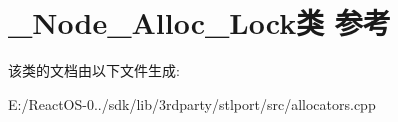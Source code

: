 \hypertarget{class___node___alloc___lock}{}\section{\+\_\+\+Node\+\_\+\+Alloc\+\_\+\+Lock类 参考}
\label{class___node___alloc___lock}


该类的文档由以下文件生成\+:\begin{DoxyCompactItemize}
\item 
E\+:/\+React\+O\+S-\/0../sdk/lib/3rdparty/stlport/src/allocators.\+cpp\end{DoxyCompactItemize}
